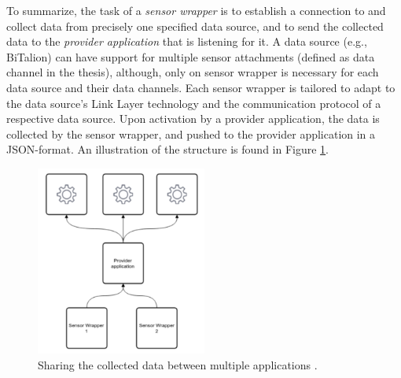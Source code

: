 To summarize, the task of a \textit{sensor wrapper} is to establish a connection to and collect data from precisely one specified data source, and to send the collected data to the \textit{provider application} that is listening for it. A data source (e.g., BiTalion) can have support for multiple sensor attachments (defined as data channel in the thesis), although, only on sensor wrapper is necessary for each data source and their data channels. Each sensor wrapper is tailored to adapt to the data source's Link Layer technology and the communication protocol of a respective data source. Upon activation by a provider application, the data is collected by the sensor wrapper, and pushed to the provider application in a JSON-format. An illustration of the structure is found in Figure \ref{fig:provider_SW}.

\begin{figure}
    \centering
    \includegraphics[width=0.5\textwidth]{images/provider_SW.png}
    \caption{Sharing the collected data between multiple applications \cite{gjoby}.}
    \label{fig:provider_SW}
\end{figure}